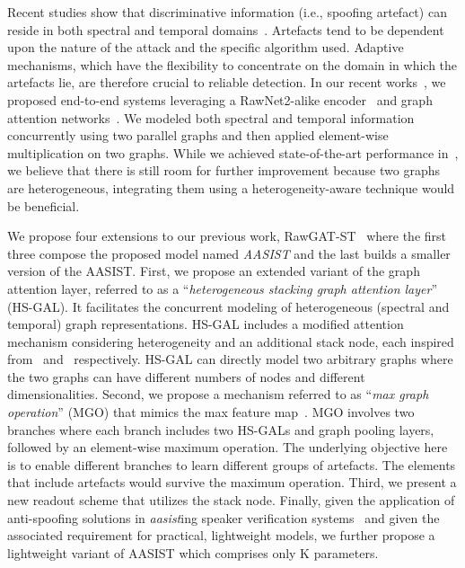 \documentclass{article}
\begin{document}
Recent studies show that discriminative information (i.e., spoofing artefact) can reside in both spectral and temporal domains~\cite{yang2019significance,sriskandaraja2016investigation,jung2019replay,odyssey2020CQCC,tak2020spoofing}. 
Artefacts tend to be dependent upon the nature of the attack and the specific algorithm used.
Adaptive mechanisms, which have the flexibility to concentrate on the domain in which the artefacts lie, are therefore crucial to reliable detection. 
In our recent works~\cite{tak2021graph,tak2021end}, we proposed end-to-end systems leveraging a RawNet2-alike encoder~\cite{jung20c_interspeech,tak2021rawnet} and graph attention networks~\cite{velickovic2018graph}. 
We modeled both spectral and temporal information concurrently using two parallel graphs and then applied element-wise multiplication on two graphs. 
While we achieved state-of-the-art performance in~\cite{tak2021end}, we believe that there is still room for further improvement because two graphs are heterogeneous, integrating them using a heterogeneity-aware technique would be beneficial.  

We propose four extensions to our previous work, RawGAT-ST~\cite{tak2021end} where the first three compose the proposed model named {\em AASIST} and the last builds a smaller version of the AASIST. 
First, we propose an extended variant of the graph attention layer, referred to as a ``{\em heterogeneous stacking graph attention layer}'' (HS-GAL). 
It facilitates the concurrent modeling of heterogeneous (spectral and temporal) graph representations. 
HS-GAL includes a modified attention mechanism considering heterogeneity and an additional stack node, each inspired from~\cite{wang2019heterogeneous} and~\cite{kenton2019bert} respectively.
HS-GAL can directly model two arbitrary graphs where the two graphs can have different numbers of nodes and different dimensionalities.  
Second, we propose a mechanism referred to as ``{\em max graph operation}'' (MGO) that mimics the max feature map~\cite{wu2018light}. 
MGO involves two branches where each branch includes two HS-GALs and graph pooling layers, followed by an element-wise maximum operation. 
The underlying objective here is to enable different branches to learn different groups of artefacts. 
The elements that include artefacts would survive the maximum operation. 
Third, we present a new readout scheme that utilizes the stack node.
Finally, given the application of anti-spoofing solutions in {\em aasist}ing speaker verification systems~\cite{Kinnunen2018tdcf,shim2020integrated} and given the associated requirement for practical, lightweight models, we further propose a lightweight variant of AASIST which comprises only K parameters.
\end{document}
